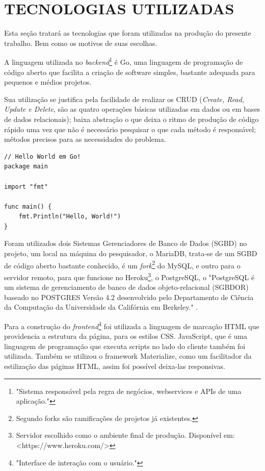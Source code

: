 \section{TECNOLOGIAS UTILIZADAS}\label{tec}

Esta seção tratará as tecnologias que foram utilizadas na produção do presente trabalho. Bem como os motivos de suas escolhas.

A linguagem utilizada no \textit{backend}\footnote{"Sistema responsável pela regra de negócios, webservices e APIs de uma aplicação."\cite{lamim14}} é Go, uma linguagem de programação de código aberto que facilita a criação de software simples, bastante adequada para pequenos e médios projetos.

Sua utilização se justifica pela facilidade de realizar os CRUD (\textit{Create, Read, Update e Delete}, são as quatro operações básicas utilizadas em dados ou em bases de dados relacionais); baixa abstração o que deixa o ritmo de produção de código rápido uma vez que não é necessário pesquisar o que cada método é responsável; métodos precisos para as necessidades do problema.

\begin{lstlisting}
// Hello World em Go!
package main

import "fmt"

func main() {
	fmt.Println("Hello, World!")
}
\end{lstlisting}

Foram utilizados dois Sistemas Gerenciadores de Banco de Dados (SGBD) no projeto, um local na máquina do pesquisador, o MariaDB, trata-se de um SGBD de código aberto bastante conhecido, é um \textit{fork}\footnote{Segundo  forks são ramificações de projetos já existentes.} do MySQL, e outro para o servidor remoto, para que funcione no Heroku\footnote{Servidor escolhido como o ambiente final de produção. Disponível em:
<https://www.heroku.com/>}, o PostgreSQL, o "PostgreSQL é um sistema de gerenciamento de banco de dados objeto-relacional (SGBDOR) baseado no POSTGRES Versão 4.2 desenvolvido pelo Departamento de Ciência da Computação da Universidade da Califórnia em Berkeley."  \cite{postgres07}.

Para a construção do \textit{frontend}\footnote{"Interface de interação com o usuário."\cite{lamim14}} foi utilizada a linguagem de marcação HTML que providencia a estrutura da página, para os estilos CSS. JavaScript, que é uma linguagem de programação que executa scripts no lado do cliente também foi utilizada. Também se utilizou o framework Materialize, como um facilitador da estilização das páginas HTML, assim foi possível deixa-las responsivas.

